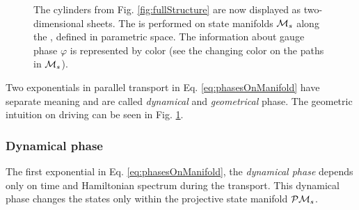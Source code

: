\begin{figure}[h]
    \centering
\caption{The cylinders from Fig. \ref{fig:fullStructure} are now displayed as two-dimensional sheets. The  is performed on state manifolds $\mathcal{M}_s$ along the , defined in parametric space. The information about gauge phase $\varphi$ is represented by color (see the changing color on the paths in $\mathcal{M}_s$).}
    \label{fig:manifoldCutIntuition}
\end{figure}

Two exponentials in parallel transport in Eq. \ref{eq:phasesOnManifold} have separate meaning and are called \emph{dynamical} and \emph{geometrical} phase. The geometric intuition on driving can be seen in Fig. \ref{fig:manifoldCutIntuition}.

\subsubsection{Dynamical phase}
The first exponential in Eq. \ref{eq:phasesOnManifold}, the \emph{dynamical phase} depends only on time and Hamiltonian spectrum during the transport. This dynamical phase changes the states only within the projective state manifold $\mathcal{P}\mathcal{M}_s$. 


